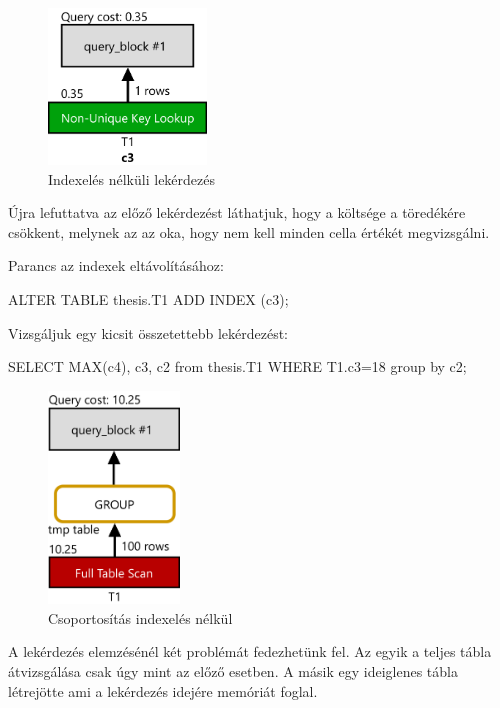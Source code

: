 \begin{figure}[h!]
\centering
\includegraphics[width=4.2cm]{images/explain/1-2.png}
\caption{Indexelés nélküli lekérdezés}
\label{fig:schema}
\end{figure}

Újra lefuttatva az előző lekérdezést láthatjuk, hogy a költsége a töredékére csökkent, melynek az az oka, hogy nem kell minden cella értékét megvizsgálni.

Parancs az indexek eltávolításához:
\begin{python} 
ALTER TABLE  thesis.T1  ADD INDEX (c3);
\end{python}

\newpage
{}

Vizsgáljuk egy kicsit összetettebb lekérdezést: 
\begin{python} 
SELECT MAX(c4), c3, c2 from thesis.T1 WHERE T1.c3=18  group by c2;
\end{python}

\begin{figure}[h!]
\centering
\includegraphics[width=3.5cm]{images/explain/2-1.png}
\caption{Csoportosítás indexelés nélkül}
\label{fig:schema}
\end{figure}

A lekérdezés elemzésénél két problémát fedezhetünk fel. Az egyik a teljes tábla átvizsgálása csak úgy mint az előző esetben. A másik egy ideiglenes tábla létrejötte ami a lekérdezés idejére memóriát foglal.

